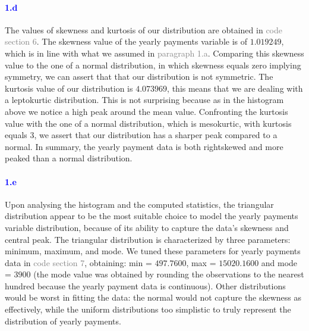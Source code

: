 \documentclass[a4paper,12pt]{article}
\begin{document}
\paragraph{\textcolor{Blue}{1.d}} The values of skewness and kurtosis of our distribution are obtained in \textcolor{gray}{code section 6}. The skewness value of the yearly payments variable is of $1.019249$, which is in line with what we assumed in \textcolor{gray}{paragraph 1.a}. Comparing this skewness value to the one of a normal distribution, in which skewness equals zero implying symmetry, we can assert that that our distribution is not symmetric. The kurtosis value of our distribution is $4.073969$, this means that we are dealing with a leptokurtic distribution. This is not surprising because as in the histogram above we notice a high peak around the mean value. Confronting the kurtosis value with the one of a normal distribution, which is mesokurtic, with kurtosis equals 3, we assert that our distribution has a sharper peak compared to a normal. In summary, the yearly payment data is both right\-skewed and more peaked than a normal distribution.
\paragraph{\textcolor{Blue}{1.e}} Upon analysing the histogram and the computed statistics, the triangular distribution appear to be the most suitable choice to model the yearly payments variable distribution, because of its ability to capture the data's skewness and central peak. The triangular distribution is characterized by three parameters: minimum, maximum, and mode. We tuned these parameters for yearly payments data in \textcolor{gray}{code section 7}, obtaining: min = $497.7600$, max = $15020.1600$ and mode = $3900$ (the mode value was obtained by rounding the observations to the nearest hundred because the yearly payment data is continuous).
Other distributions would be worst in fitting the data: the normal would not capture the skewness as effectively, while the uniform distributions too simplistic to truly represent the distribution of yearly payments.
\end{document}
